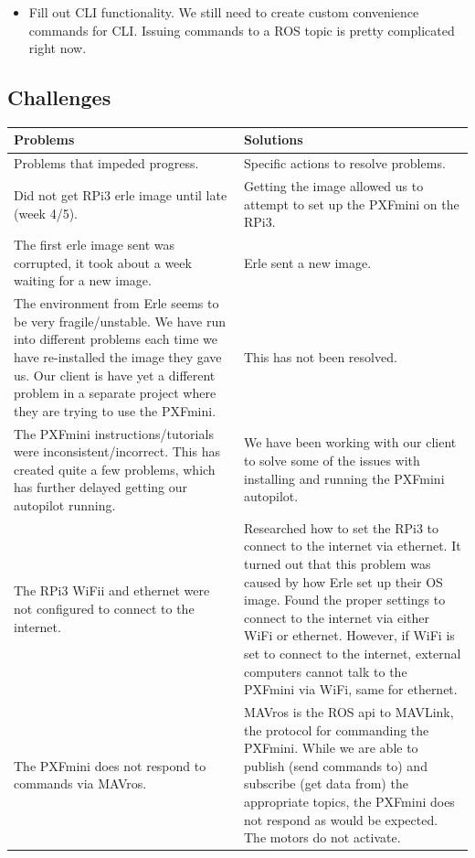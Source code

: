 \documentclass[compsoc,draftclsnofoot,onecolumn,10pt]{IEEEtran}
\begin{document}
\begin{itemize}
\begin{itemize}
	\item Fill out CLI functionality. We still need to create custom convenience commands for CLI. Issuing commands to a ROS topic is pretty complicated right now.\par
\end{itemize}

\subsection{Challenges}

\begin{tabular}{|p{0.5\linewidth}|p{0.5\linewidth}|}
	\hline
	\textbf{Problems} & \textbf{Solutions}\\
	\hline	
	Problems that impeded progress. & Specific actions to resolve problems.\\
	\hline
	Did not get RPi3 erle image until late (week 4/5). & Getting the image allowed us to attempt to set up the PXFmini on the RPi3.\\
	\hline
	The first erle image sent was corrupted, it took about a week waiting for a new image. & Erle sent a new image.\\
	\hline
	The environment from Erle seems to be very fragile/unstable. We have run into different problems each time we have re-installed the image they gave us. Our client is have yet a different problem in a separate project where they are trying to use the PXFmini. & This has not been resolved.\\
	\hline
	The PXFmini instructions/tutorials were inconsistent/incorrect. This has created quite a few problems, which has further delayed getting our autopilot running. & We have been working with our client to solve some of the issues with installing and running the PXFmini autopilot.\\
	\hline
	The RPi3 WiFii and ethernet were not configured to connect to the internet. & Researched how to set the RPi3 to connect to the internet via ethernet. It turned out that this problem was caused by how Erle set up their OS image. Found the proper settings to connect to the internet via either WiFi or ethernet. However, if WiFi is set to connect to the internet, external computers cannot talk to the PXFmini via WiFi, same for ethernet.\\
	\hline
	The PXFmini does not respond to commands via MAVros. & MAVros is the ROS api to MAVLink, the protocol for commanding the PXFmini. While we are able to publish (send commands to) and subscribe (get data from) the appropriate topics, the PXFmini does not respond as would be expected. The motors do not activate.\par

\end{tabular}
\end{itemize}
\end{document}
